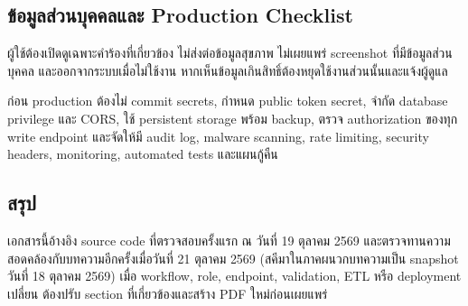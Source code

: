 \subsection{ข้อมูลส่วนบุคคลและ Production Checklist}
ผู้ใช้ต้องเปิดดูเฉพาะคำร้องที่เกี่ยวข้อง ไม่ส่งต่อข้อมูลสุขภาพ ไม่เผยแพร่ screenshot ที่มีข้อมูลส่วนบุคคล และออกจากระบบเมื่อไม่ใช้งาน หากเห็นข้อมูลเกินสิทธิ์ต้องหยุดใช้งานส่วนนั้นและแจ้งผู้ดูแล

ก่อน production ต้องไม่ commit secrets, กำหนด public token secret, จำกัด database privilege และ CORS, ใช้ persistent storage พร้อม backup, ตรวจ authorization ของทุก write endpoint และจัดให้มี audit log, malware scanning, rate limiting, security headers, monitoring, automated tests และแผนกู้คืน

\subsection{สรุป}
เอกสารนี้อ้างอิง source code ที่ตรวจสอบครั้งแรก ณ วันที่ 19 ตุลาคม 2569 และตรวจทานความสอดคล้องกับบทความอีกครั้งเมื่อวันที่ 21 ตุลาคม 2569 (สคีมาในภาคผนวกบทความเป็น snapshot วันที่ 18 ตุลาคม 2569) เมื่อ workflow, role, endpoint, validation, ETL หรือ deployment เปลี่ยน ต้องปรับ section ที่เกี่ยวข้องและสร้าง PDF ใหม่ก่อนเผยแพร่
